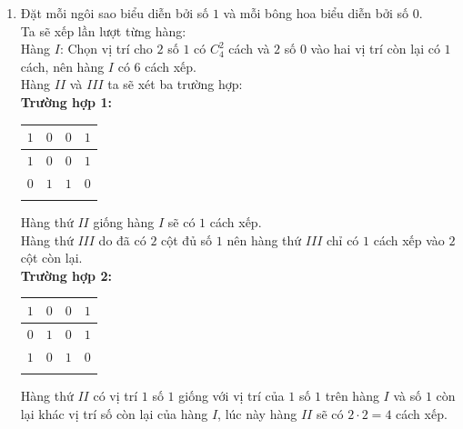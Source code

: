 \begin{ex}
{\begin{enumerate}
			Chọn $2$ loại từ $3$ loại có $C_3^2$ cách.\\
			Sau khi chọn được $2$ loại, ta sẽ có $4$ hàng. Do các hàng đôi một khác nhau nên hoán vị hàng có $4!$ cách.\\
			Trường hợp này ta có $C_3^2 \cdot 4!=72$.\\
			Vậy các trường hợp của biến cố $A \cap B$ là $18+72=90$.\\
			Khi đó, $n(A \cup B)=n(A)+n(B)-n(A \cap B)=1296+1296-90=2502$.
			\item 
			Đặt mỗi ngôi sao biểu diễn bởi số $1$ và mỗi bông hoa biểu diễn bởi số $0$.\\
			Ta sẽ xếp lần lượt từng hàng:\\
			Hàng $I$: Chọn vị trí cho $2$ số $1$ có $C_4^2$ cách và $2$ số $0$ vào hai vị trí còn lại có $1$ cách, nên hàng $I$ có $6$ cách xếp.\\
			Hàng $II$ và $III$ ta sẽ xét ba trường hợp:\\[4pt]
			\textbf{Trường hợp 1:}
			\begin{center}
				\begin{tabular}{|c|c|c|c|}
					\hline
					$1$ & $0$ & $0$ & $1$ \\ \hline
					$1$ & $0$ & $0$ & $1$ \\ \hline
					$0$ & $1$ & $1$ & $0$ \\ \hline
					& & & \\ \hline
				\end{tabular}
			\end{center}
			Hàng thứ $II$ giống hàng $I$ sẽ có $1$ cách xếp.\\
			Hàng thứ $III$ do đã có $2$ cột đủ số $1$ nên hàng thứ $III$ chỉ có $1$ cách xếp vào $2$ cột còn lại.\\[4pt]
			\textbf{Trường hợp 2:}
			\begin{center}
				\begin{tabular}{|c|c|c|c|}
					\hline
					$1$ & $0$ & $0$ & $1$ \\ \hline
					$0$ & $1$ & $0$ & $1$ \\ \hline
					$1$ & $0$ & $1$ & $0$ \\ \hline
					& & & \\ \hline
				\end{tabular}
			\end{center}
			Hàng thứ $II$ có vị trí $1$ số $1$ giống với vị trí của $1$ số $1$ trên hàng $I$ và số $1$ còn lại khác vị trí số còn lại của hàng $I$, lúc này hàng $II$ sẽ có $2 \cdot 2=4$ cách xếp.\\

\end{enumerate}}
\end{ex}
